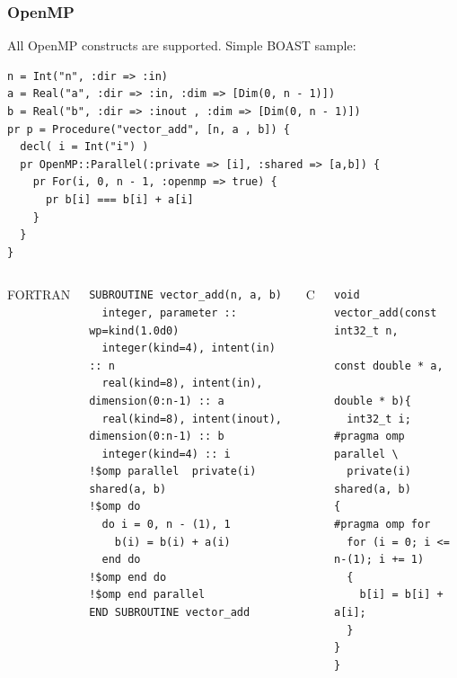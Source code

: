 \documentclass{beamer}
\begin{document}

\begin{frame}[fragile]
\frametitle{OpenMP}
  All OpenMP constructs are supported. Simple BOAST sample:
\lstset{style=BOAST}
\begin{lstlisting}
n = Int("n", :dir => :in)
a = Real("a", :dir => :in, :dim => [Dim(0, n - 1)])
b = Real("b", :dir => :inout , :dim => [Dim(0, n - 1)])
pr p = Procedure("vector_add", [n, a , b]) {
  decl( i = Int("i") )
  pr OpenMP::Parallel(:private => [i], :shared => [a,b]) {
    pr For(i, 0, n - 1, :openmp => true) {
      pr b[i] === b[i] + a[i]
    }
  }
}
\end{lstlisting}
\begin{columns}
FORTRAN
\lstset{style=BFortran}
\begin{lstlisting}
SUBROUTINE vector_add(n, a, b)
  integer, parameter :: wp=kind(1.0d0)
  integer(kind=4), intent(in) :: n
  real(kind=8), intent(in), dimension(0:n-1) :: a
  real(kind=8), intent(inout), dimension(0:n-1) :: b
  integer(kind=4) :: i
!$omp parallel  private(i) shared(a, b)
!$omp do 
  do i = 0, n - (1), 1
    b(i) = b(i) + a(i)
  end do
!$omp end do 
!$omp end parallel 
END SUBROUTINE vector_add
\end{lstlisting}
C
\lstset{style=BC}
\begin{lstlisting}
void vector_add(const int32_t n,
                const double * a,
                double * b){
  int32_t i;
#pragma omp parallel \
  private(i) shared(a, b)
{
#pragma omp for 
  for (i = 0; i <= n-(1); i += 1)
  {
    b[i] = b[i] + a[i];
  }
}
}
\end{lstlisting}
\end{columns}
\end{frame}
\end{document}

